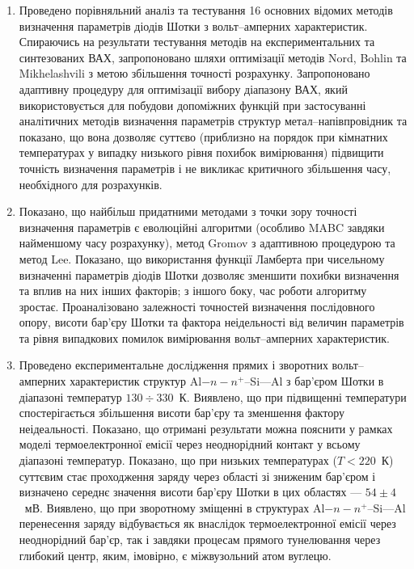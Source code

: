 \begin{enumerate}
\item  Проведено порівняльний аналіз та тестування 16 основних відомих методів визначення параметрів діодів Шотки з вольт--амперних характеристик.
         Спираючись на результати тестування методів на експериментальних та синтезованих  ВАХ,
         запропоновано шляхи оптимізації методів Nord, Bohlin та Mikhelashvili з метою збільшення точності розрахунку.
      Запропоновано адаптивну процедуру для оптимізації вибору діапазону ВАХ, який використовується для побудови допоміжних функцій при застосуванні аналітичних методів визначення параметрів структур метал--напівпровідник та показано, що вона дозволяє суттєво (приблизно на порядок при кімнатних температурах у випадку низького рівня похибок вимірювання) підвищити точність визначення параметрів і не викликає критичного збільшення часу, необхідного для розрахунків.

   \item Показано, що найбільш придатними методами з точки зору точності визначення параметрів є еволюційні алгоритми (особливо MABC завдяки найменшому часу розрахунку), метод Gromov з адаптивною процедурою та метод Lee.
    Показано, що використання функції Ламберта при чисельному визначенні параметрів діодів Шотки дозволяє зменшити похибки визначення та вплив на них інших факторів; з іншого боку, час роботи алгоритму зростає.
    Проаналізовано залежності точностей визначення послідовного опору, висоти бар'єру Шотки та фактора неідельності від величин параметрів та рівня випадкових помилок вимірювання вольт--амперних характеристик.

   \item
Проведено експериментальне дослідження прямих і зворотних вольт--амперних характеристик структур Al$-n-n^+$--Si---Al з бар'єром Шотки в діапазоні температур $130\div330$~К.
Виявлено, що при підвищенні температури спостерігається збільшення висоти бар'єру та зменшення фактору неідеальності.
       Показано, що отримані результати можна пояснити у рамках моделі термоелектронної емісії через неоднорідний контакт у всьому діапазоні температур.
         Показано, що при низьких температурах ($T<220$~К) суттєвим стає проходження заряду через області зі зниженим бар'єром і визначено середнє значення висоти бар'єру Шотки в цих областях --- $54\pm4$~мВ.
     Виявлено, що при зворотному зміщенні в структурах Al$-n-n^+$--Si---Al перенесення заряду відбувається як внаслідок термоелектронної емісії через неоднорідний бар'єр, так і завдяки процесам прямого тунелювання через глибокий центр,
          яким, імовірно, є міжвузольний атом вуглецю.


\end{enumerate}
